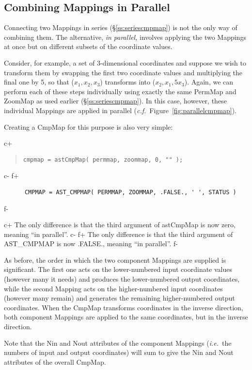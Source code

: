 \documentclass[twoside,11pt]{article}
\newcommand{\secref}[1]{\S\ref{#1}}
\newcommand{\secref}[1]{\ref{#1}}
\begin{document}
\subsection{Combining Mappings in Parallel}

Connecting two Mappings in series (\secref{ss:seriescmpmap}) is not the
only way of combining them. The alternative, {\em{in parallel,}}
involves applying the two Mappings at once but on different subsets of
the coordinate values.

Consider, for example, a set of 3-dimensional coordinates and suppose
we wish to transform them by swapping the first two coordinate values
and multiplying the final one by 5, so that ($x_1,x_2,x_3$) transforms
into ($x_2,x_1,5x_3$). Again, we can perform each of these steps
individually using exactly the same PermMap and ZoomMap as used
earlier (\secref{ss:seriescmpmap}). In this case, however, these
individual Mappings are applied in parallel
({\em{c.f.}}\ Figure~\ref{fig:parallelcmpmap}).

Creating a CmpMap for this purpose is also very simple:

c+
\begin{quote}
\small
\begin{verbatim}
cmpmap = astCmpMap( permmap, zoommap, 0, "" );
\end{verbatim}
\normalsize
\end{quote}
c-
f+
\small
\begin{verbatim}
      CMPMAP = AST_CMPMAP( PERMMAP, ZOOMMAP, .FALSE., ' ', STATUS )
\end{verbatim}
\normalsize
f-

c+
The only difference is that the third argument of astCmpMap is now
zero, meaning ``in parallel''.
c-
f+
The only difference is that the third argument of AST\_CMPMAP is now
.FALSE., meaning ``in parallel''.
f-

As before, the order in which the two component Mappings are supplied
is significant. The first one acts on the lower-numbered input
coordinate values (however many it needs) and produces the
lower-numbered output coordinates, while the second Mapping acts on
the higher-numbered input coordinates (however many remain) and
generates the remaining higher-numbered output coordinates.  When the
CmpMap transforms coordinates in the inverse direction, both component
Mappings are applied to the same coordinates, but in the inverse
direction.

Note that the Nin and Nout attributes of the component Mappings
({\em{i.e.}}\ the numbers of input and output coordinates) will sum to
give the Nin and Nout attributes of the overall CmpMap.
\end{document}
